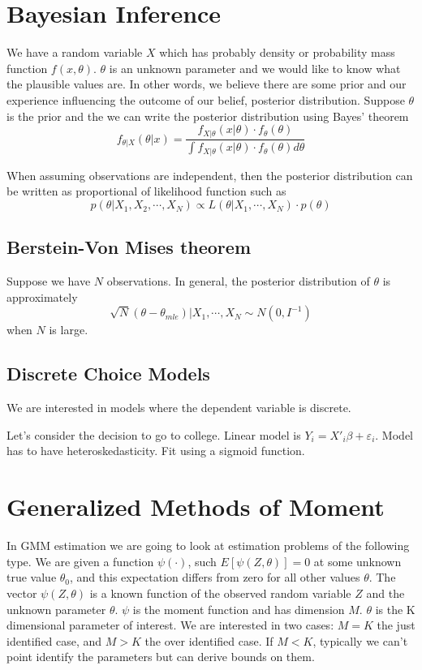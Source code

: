 \documentclass[11pt, a4paper, oneside]{article}
\theoremstyle{definition}
\theoremstyle{proposition}
\theoremstyle{corollary}
\theoremstyle{lemma}
\theoremstyle{theorem}
\begin{document}
\section{Bayesian Inference}
We have a random variable $X$ which has probably density or probability mass function $f(x, \theta)$. $\theta$ is an unknown parameter and we would like to know what the plausible values are. In other words, we believe there are some prior and our experience influencing the outcome of our belief, posterior distribution. Suppose $\theta$ is the prior and the we can write the posterior distribution using Bayes' theorem
$$f_{\theta|X}(\theta|x) = \frac{f_{X|\theta}(x|\theta)\cdot f_{\theta}(\theta)}{\int f_{X|\theta}(x|\theta)\cdot f_{\theta}(\theta)d\theta}$$

When assuming observations are independent, then the posterior distribution can be written as proportional of likelihood function such as
$$p(\theta|X_1, X_2, \cdots, X_N) \propto L(\theta|X_1, \cdots, X_N)\cdot p(\theta)$$

\subsection{Berstein-Von Mises theorem}
Suppose we have $N$ observations. In general, the posterior distribution of $\theta$ is approximately 
$$\sqrt{N}(\theta - \theta_{mle})|X_1, \cdots, X_N \sim N(0, I^{-1})$$ when $N$ is large. 

\subsection{Discrete Choice Models}
We are interested in models where the dependent variable is discrete. 

Let's consider the decision to go to college. Linear model is $Y_i =X'_i\beta + \varepsilon_i$. Model has to have heteroskedasticity. Fit using a sigmoid function. 

\section{Generalized Methods of Moment}
In GMM estimation we are going to look at estimation problems of the following type. We are given a function $\psi(\cdot)$, such $E[\psi(Z, \theta)] = 0$ at some unknown true value $\theta_0$, and this expectation differs from zero for all other values $\theta$. The vector $\psi(Z, \theta)$ is a known function of the observed random variable $Z$ and the unknown parameter $\theta$. $\psi$ is the moment function and has dimension $M$. $\theta$ is the K dimensional parameter of interest. We are interested in two cases: $M=K$ the just identified case, and $M>K$ the over identified case. If $M < K$, typically we can't point identify the parameters but can derive bounds on them. 
\end{document}

